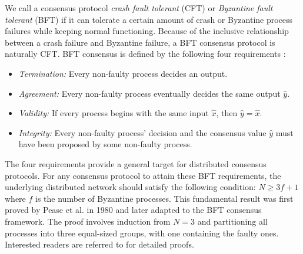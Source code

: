 We call a consensus protocol \textit{crash fault tolerant} (CFT) or \textit{Byzantine fault tolerant} (BFT) if it can tolerate a certain amount of crash or Byzantine process failures while keeping normal functioning. Because of the inclusive relationship between a crash failure and Byzantine failure, a BFT consensus protocol is naturally CFT. BFT consensus is defined by the following four requirements :
\begin{itemize}
    \item \textit{Termination:} Every non-faulty process decides an output.
    \item \textit{Agreement:} Every non-faulty process eventually decides the same output $\hat{y}$.
    \item \textit{Validity:} If every process begins with the same input $\hat{x}$, then $\hat{y}=\hat{x}$.
    \item \textit{Integrity:} Every non-faulty process' decision and the consensus value $\hat{y}$ must have been proposed by some non-faulty process.
\end{itemize}
The four requirements provide a general target for distributed consensus protocols. For any consensus protocol to attain these BFT requirements, the underlying distributed network should satisfy the following condition: $N\geq3f+1$ where $f$ is the number of Byzantine processes. This fundamental result was first proved by Pease et al.  in 1980 and later adapted to the BFT consensus framework. The proof involves induction from $N=3$ and partitioning all processes into three equal-sized groups, with one containing the faulty ones. Interested readers are referred to  for detailed proofs.

